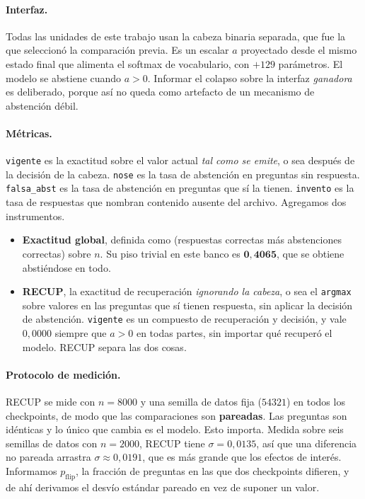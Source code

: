 \documentclass[11pt,a4paper]{article}
\begin{document}
\paragraph{Interfaz.} Todas las unidades de este trabajo usan la cabeza binaria separada, que fue la
que seleccionó la comparación previa. Es un escalar $a$ proyectado desde el mismo estado final que
alimenta el softmax de vocabulario, con $+129$ parámetros. El modelo se abstiene cuando $a > 0$.
Informar el colapso sobre la interfaz \emph{ganadora} es deliberado, porque así no queda como artefacto
de un mecanismo de abstención débil.

\paragraph{Métricas.} \texttt{vigente} es la exactitud sobre el valor actual \emph{tal como se emite},
o sea después de la decisión de la cabeza. \texttt{nose} es la tasa de abstención en preguntas sin
respuesta. \texttt{falsa\_abst} es la tasa de abstención en preguntas que sí la tienen. \texttt{invento}
es la tasa de respuestas que nombran contenido ausente del archivo. Agregamos dos instrumentos.

\begin{itemize}
\item \textbf{Exactitud global}, definida como (respuestas correctas más abstenciones correctas) sobre
$n$. Su piso trivial en este banco es $\mathbf{0{,}4065}$, que se obtiene abstiéndose en todo.
\item \textbf{RECUP}, la exactitud de recuperación \emph{ignorando la cabeza}, o sea el \texttt{argmax}
sobre valores en las preguntas que sí tienen respuesta, sin aplicar la decisión de abstención.
\texttt{vigente} es un compuesto de recuperación y decisión, y vale $0{,}0000$ siempre que $a > 0$ en
todas partes, sin importar qué recuperó el modelo. RECUP separa las dos cosas.
\end{itemize}

\paragraph{Protocolo de medición.} RECUP se mide con $n = 8000$ y una semilla de datos fija ($54321$)
en todos los checkpoints, de modo que las comparaciones son \textbf{pareadas}. Las preguntas son
idénticas y lo único que cambia es el modelo. Esto importa. Medida sobre seis semillas de datos con
$n=2000$, RECUP tiene $\sigma = 0{,}0135$, así que una diferencia no pareada arrastra
$\sigma \approx 0{,}0191$, que es más grande que los efectos de interés. Informamos $p_{\mathrm{flip}}$,
la fracción de preguntas en las que dos checkpoints difieren, y de ahí derivamos el desvío estándar
pareado en vez de suponer un valor.
\end{document}
